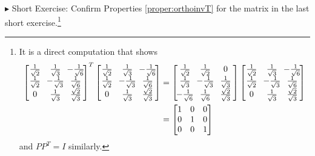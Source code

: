 $\blacktriangleright$ Short Exercise: Confirm Properties \ref{proper:orthoinvT} for the matrix in the last short exercise.\footnote{It is a direct computation that shows
\begin{align*}
\left[\begin{array}{@{}wc{14pt}wc{14pt}wc{14pt}@{\,}}
\frac{1}{\sqrt{2}} & \frac{1}{\sqrt{3}} & -\frac{1}{\sqrt{6}} \\
\frac{1}{\sqrt{2}} & -\frac{1}{\sqrt{3}} & \frac{1}{\sqrt{6}} \\
0 & \frac{1}{\sqrt{3}} & \frac{\sqrt{2}}{\sqrt{3}}
\end{array}\right]^T
\left[\begin{array}{@{}wc{14pt}wc{14pt}wc{14pt}@{\,}}
\frac{1}{\sqrt{2}} & \frac{1}{\sqrt{3}} & -\frac{1}{\sqrt{6}} \\
\frac{1}{\sqrt{2}} & -\frac{1}{\sqrt{3}} & \frac{1}{\sqrt{6}} \\
0 & \frac{1}{\sqrt{3}} & \frac{\sqrt{2}}{\sqrt{3}}
\end{array}\right] &=
\left[\begin{array}{@{\,}wc{14pt}wc{14pt}wc{14pt}@{\,}}
\frac{1}{\sqrt{2}} & \frac{1}{\sqrt{2}} & 0 \\
\frac{1}{\sqrt{3}} & -\frac{1}{\sqrt{3}} & \frac{1}{\sqrt{3}} \\
-\frac{1}{\sqrt{6}} & \frac{1}{\sqrt{6}} & \frac{\sqrt{2}}{\sqrt{3}}
\end{array}\right]
\left[\begin{array}{@{}wc{14pt}wc{14pt}wc{14pt}@{\,}}
\frac{1}{\sqrt{2}} & \frac{1}{\sqrt{3}} & -\frac{1}{\sqrt{6}} \\
\frac{1}{\sqrt{2}} & -\frac{1}{\sqrt{3}} & \frac{1}{\sqrt{6}} \\
0 & \frac{1}{\sqrt{3}} & \frac{\sqrt{2}}{\sqrt{3}}
\end{array}\right] \\
&=
\begin{bmatrix}
1 & 0 & 0 \\
0 & 1 & 0 \\
0 & 0 & 1
\end{bmatrix}
\end{align*}
and $PP^T = I$ similarly.}

